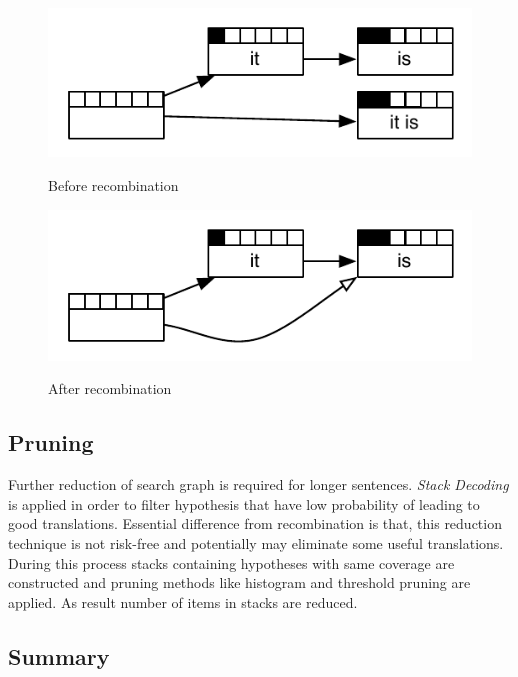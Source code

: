 \begin{figure}
 \centering 
 \includegraphics{g/recombination-example1.pdf}
 \caption{Before recombination}
 \caption*{\textit{\cite{Koehn2009a}}}
\end{figure}


\begin{figure}
 \centering 
 \includegraphics{g/recombination-example2.pdf}
 \caption{After recombination}
 \caption*{\textit{\cite{Koehn2009a}}}
\end{figure}


\subsection{Pruning}

Further reduction of search graph is required for longer sentences. \textit{Stack Decoding} is applied in order to filter hypothesis that have low probability of leading to good translations. Essential difference from recombination is that, this reduction technique is not risk-free and potentially may eliminate some useful translations. During this process stacks containing hypotheses with same coverage are constructed and pruning methods like histogram and threshold pruning are applied. As result number of items in stacks are reduced. 


\subsection{Summary}

